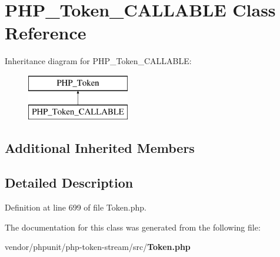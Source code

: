 \section{P\+H\+P\+\_\+\+Token\+\_\+\+C\+A\+L\+L\+A\+B\+L\+E Class Reference}
\label{class_p_h_p___token___c_a_l_l_a_b_l_e}
Inheritance diagram for P\+H\+P\+\_\+\+Token\+\_\+\+C\+A\+L\+L\+A\+B\+L\+E\+:\begin{figure}[H]
\begin{center}
\leavevmode
\includegraphics[height=2.000000cm]{class_p_h_p___token___c_a_l_l_a_b_l_e}
\end{center}
\end{figure}
\subsection*{Additional Inherited Members}


\subsection{Detailed Description}


Definition at line 699 of file Token.\+php.



The documentation for this class was generated from the following file\+:\begin{DoxyCompactItemize}
\item 
vendor/phpunit/php-\/token-\/stream/src/{\bf Token.\+php}\end{DoxyCompactItemize}
